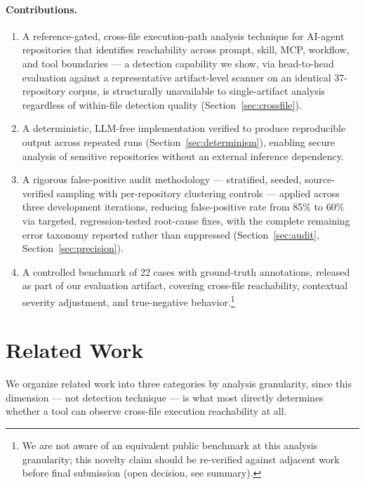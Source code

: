 \documentclass[sigconf,anonymous,review]{acmart}
\begin{document}
\paragraph{Contributions.}
\begin{enumerate}
\item A reference-gated, cross-file execution-path analysis technique for AI-agent repositories that identifies reachability across prompt, skill, MCP, workflow, and tool boundaries --- a detection capability we show, via head-to-head evaluation against a representative artifact-level scanner on an identical 37-repository corpus, is structurally unavailable to single-artifact analysis regardless of within-file detection quality (Section~\ref{sec:crossfile}).
\item A deterministic, LLM-free implementation verified to produce reproducible output across repeated runs (Section~\ref{sec:determinism}), enabling secure analysis of sensitive repositories without an external inference dependency.
\item A rigorous false-positive audit methodology --- stratified, seeded, source-verified sampling with per-repository clustering controls --- applied across three development iterations, reducing false-positive rate from 85\% to 60\% via targeted, regression-tested root-cause fixes, with the complete remaining error taxonomy reported rather than suppressed (Section~\ref{sec:audit}, Section~\ref{sec:precision}).
\item A controlled benchmark of 22 cases with ground-truth annotations, released as part of our evaluation artifact, covering cross-file reachability, contextual severity adjustment, and true-negative behavior.\footnote{We are not aware of an equivalent public benchmark at this analysis granularity; this novelty claim should be re-verified against adjacent work before final submission (open decision, see summary).}
\end{enumerate}

\section{Related Work}
\label{sec:related}

We organize related work into three categories by analysis granularity, since this dimension --- not detection technique --- is what most directly determines whether a tool can observe cross-file execution reachability at all.
\end{document}

